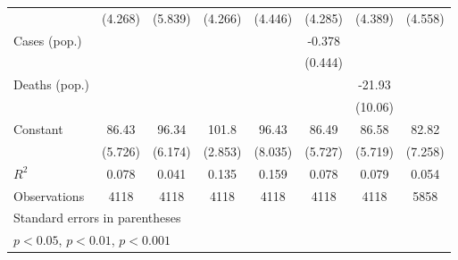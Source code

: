 \documentclass{article}
\begin{document}
{\begin{longtable}{l*{7}{c}}
                &  (4.268)         &  (5.839)         &  (4.266)         &  (4.446)         &  (4.285)         &  (4.389)         &  (4.558)         \\
Cases (pop.)    &                  &                  &                  &                  &   -0.378         &                  &                  \\
                &                  &                  &                  &                  &  (0.444)         &                  &                  \\
Deaths (pop.)   &                  &                  &                  &                  &                  &   -21.93\sym{*}  &                  \\
                &                  &                  &                  &                  &                  &  (10.06)         &                  \\
Constant        &    86.43\sym{***}&    96.34\sym{***}&    101.8\sym{***}&    96.43\sym{***}&    86.49\sym{***}&    86.58\sym{***}&    82.82\sym{***}\\
                &  (5.726)         &  (6.174)         &  (2.853)         &  (8.035)         &  (5.727)         &  (5.719)         &  (7.258)         \\
\hline
\(R^{2}\)       &    0.078         &    0.041         &    0.135         &    0.159         &    0.078         &    0.079         &    0.054         \\
Observations    &     4118         &     4118         &     4118         &     4118         &     4118         &     4118         &     5858         \\
\hline\hline
\multicolumn{8}{l}{\footnotesize Standard errors in parentheses}\\
\multicolumn{8}{l}{\footnotesize \sym{*} \(p<0.05\), \sym{**} \(p<0.01\), \sym{***} \(p<0.001\)}\\
\end{longtable}
}
\end{document}
